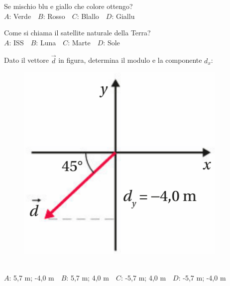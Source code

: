 \mcquestionfooter



\def\mcquestionnumber{10}


\mcquestionheader Se mischio blu e giallo che colore ottengo?\\
{$A$}: Verde\ \ {$B$}: Rosso\ \ {$C$}: Blallo\ \ {$D$}: Giallu\ \ 

\mcquestionfooter



\def\mcquestionnumber{11}


\mcquestionheader Come si chiama il satellite naturale della Terra?\\
{$A$}: ISS\ \ {$B$}: Luna\ \ {$C$}: Marte\ \ {$D$}: Sole\ \ 

\mcquestionfooter



\def\mcquestionnumber{12}


\mcquestionheader Dato il vettore $\vec{d}$ in figura, determina il modulo e la componente $d_x$: \begin{figure}[h!]   \begin{center}     \includegraphics[scale=0.35]{vettored.png}   \end{center} \end{figure}\\
{$A$}: 5,7 m; -4,0 m\ \ {$B$}: 5,7 m; 4,0 m\ \ {$C$}: -5,7 m; 4,0 m\ \ {$D$}: -5,7 m; -4,0 m\ \ 

\mcquestionfooter



\mcpaperfooter

\def\mcserialnumber{39}
\mcpaperheader


